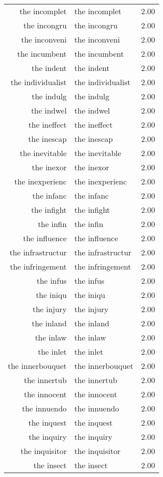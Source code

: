 \begin{table}[ht]
\begin{tabular}{rlr}
  the incomplet & the incomplet & 2.00 \\ 
  the incongru & the incongru & 2.00 \\ 
  the inconveni & the inconveni & 2.00 \\ 
  the incumbent & the incumbent & 2.00 \\ 
  the indent & the indent & 2.00 \\ 
  the individualist & the individualist & 2.00 \\ 
  the indulg & the indulg & 2.00 \\ 
  the indwel & the indwel & 2.00 \\ 
  the ineffect & the ineffect & 2.00 \\ 
  the inescap & the inescap & 2.00 \\ 
  the inevitable & the inevitable & 2.00 \\ 
  the inexor & the inexor & 2.00 \\ 
  the inexperienc & the inexperienc & 2.00 \\ 
  the infanc & the infanc & 2.00 \\ 
  the infight & the infight & 2.00 \\ 
  the infin & the infin & 2.00 \\ 
  the influence & the influence & 2.00 \\ 
  the infrastructur & the infrastructur & 2.00 \\ 
  the infringement & the infringement & 2.00 \\ 
  the infus & the infus & 2.00 \\ 
  the iniqu & the iniqu & 2.00 \\ 
  the injury & the injury & 2.00 \\ 
  the inland & the inland & 2.00 \\ 
  the inlaw & the inlaw & 2.00 \\ 
  the inlet & the inlet & 2.00 \\ 
  the innerbouquet & the innerbouquet & 2.00 \\ 
  the innertub & the innertub & 2.00 \\ 
  the innocent & the innocent & 2.00 \\ 
  the innuendo & the innuendo & 2.00 \\ 
  the inquest & the inquest & 2.00 \\ 
  the inquiry & the inquiry & 2.00 \\ 
  the inquisitor & the inquisitor & 2.00 \\ 
  the insect & the insect & 2.00 \\ 

\end{tabular}
\end{table}
